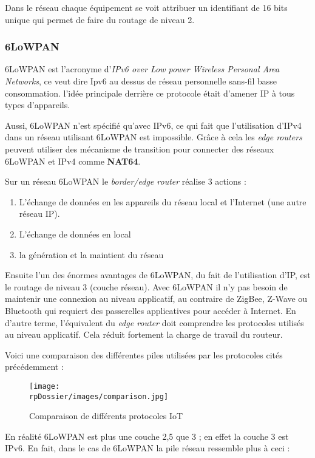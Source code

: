Dans le réseau chaque équipement se voit attribuer un identifiant de 16 bits unique qui permet de faire du routage de niveau 2.

\subsubsection{6LoWPAN}

6LoWPAN est l'acronyme d'\textit{IPv6 over Low power Wireless Personal Area Networks}, ce veut dire Ipv6 au dessus de réseau personnelle sans-fil basse consommation. l'idée principale derrière ce protocole était d'amener IP à tous types d'appareils. 

Aussi, 6LoWPAN n'est spécifié qu'avec IPv6, ce qui fait que l'utilisation d'IPv4 dans un réseau utilisant 6LoWPAN est impossible. Grâce à cela les \textit{edge routers} peuvent utiliser des mécanisme de transition pour connecter des réseaux 6LoWPAN et IPv4 comme \textbf{NAT64}.

Sur un réseau 6LoWPAN le \textit{border/edge router} réalise 3 actions :
\begin{enumerate}
\item L'échange de données en les appareils du réseau local et l'Internet (une autre réseau IP).
\item L'échange de données en local
\item la génération et la maintient du réseau
\end{enumerate}

Ensuite l'un des énormes avantages de 6LoWPAN, du fait de l'utilisation d'IP, est le routage de niveau 3 (couche réseau). Avec 6LoWPAN il n'y pas besoin de maintenir une connexion au niveau applicatif, au contraire de ZigBee, Z-Wave ou Bluetooth qui requiert des passerelles applicatives pour accéder à Internet. En d'autre terme, l'équivalent du \textit{edge router} doit comprendre les protocoles utilisés au niveau applicatif. Cela réduit fortement la charge de travail du routeur.

Voici une comparaison des différentes piles utilisées par les protocoles cités précédemment : 

\begin{figure}[H]
\centering
\texttt{[image: \\rpDossier/images/comparison.jpg]}
\caption{Comparaison de différents protocoles IoT}
\label{comparison}
\end{figure}


En réalité 6LoWPAN est plus une couche 2,5 que 3 ; en effet la couche 3 est IPv6. En fait, dans le cas de 6LoWPAN la pile réseau ressemble plus à ceci :


